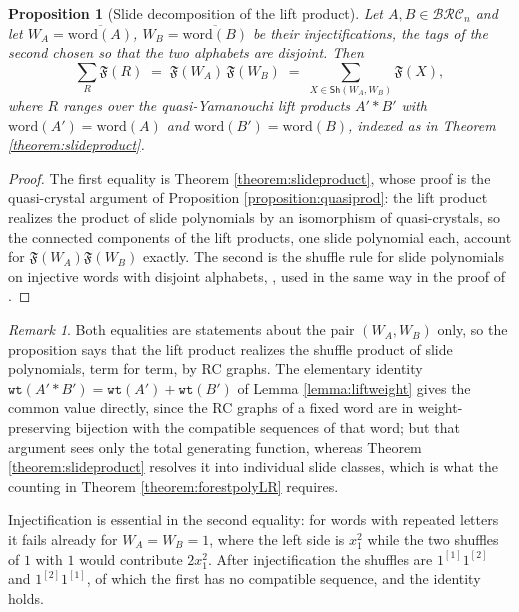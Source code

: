 \documentclass{amsart}
\newtheorem{proposition}[lemma]{Proposition}
\theoremstyle{definition}
\theoremstyle{remark}
\newtheorem*{remark}{Remark}
\numberwithin{equation}{subsection}
\newcommand{\wtt}{\mathtt{wt}}
\newcommand{\BRC}{\mathcal{BRC}}
\begin{document}
\begin{proposition}[Slide decomposition of the lift product]\label{proposition:liftshufflewords}
Let $A,B\in\BRC_n$ and let $W_A=\overline{\mathrm{word}(A)}$, $W_B=\overline{\mathrm{word}(B)}$ be their injectifications, the tags of the second chosen so that the two alphabets are disjoint. Then
$$\sum_{R}\mathfrak{F}(R)\;=\;\mathfrak{F}(W_A)\,\mathfrak{F}(W_B)\;=\;\sum_{X\in\mathsf{Sh}(W_A,W_B)}\mathfrak{F}(X),$$
where $R$ ranges over the quasi-Yamanouchi lift products $A'*B'$ with $\mathrm{word}(A')=\mathrm{word}(A)$ and $\mathrm{word}(B')=\mathrm{word}(B)$, indexed as in Theorem \ref{theorem:slideproduct}.
\end{proposition}
\begin{proof}
The first equality is Theorem \ref{theorem:slideproduct}, whose proof is the quasi-crystal argument of Proposition \ref{proposition:quasiprod}: the lift product realizes the product of slide polynomials by an isomorphism of quasi-crystals, so the connected components of the lift products, one slide polynomial each, account for $\mathfrak{F}(W_A)\mathfrak{F}(W_B)$ exactly. The second is the shuffle rule for slide polynomials on injective words with disjoint alphabets, \cite[\S3.4]{nadeau2024forest}, used in the same way in the proof of \cite[Theorem~6.3]{nadeau2024forest}.
\end{proof}

\begin{remark}
Both equalities are statements about the pair $(W_A,W_B)$ only, so the proposition says that the lift product realizes the shuffle product of slide polynomials, term for term, by RC graphs. The elementary identity $\wtt(A'*B')=\wtt(A')+\wtt(B')$ of Lemma \ref{lemma:liftweight} gives the common value directly, since the RC graphs of a fixed word are in weight-preserving bijection with the compatible sequences of that word; but that argument sees only the total generating function, whereas Theorem \ref{theorem:slideproduct} resolves it into individual slide classes, which is what the counting in Theorem \ref{theorem:forestpolyLR} requires.

Injectification is essential in the second equality: for words with repeated letters it fails already for $W_A=W_B=1$, where the left side is $x_1^2$ while the two shuffles of $1$ with $1$ would contribute $2x_1^2$. After injectification the shuffles are $1^{[1]}1^{[2]}$ and $1^{[2]}1^{[1]}$, of which the first has no compatible sequence, and the identity holds.
\end{remark}
\end{document}
